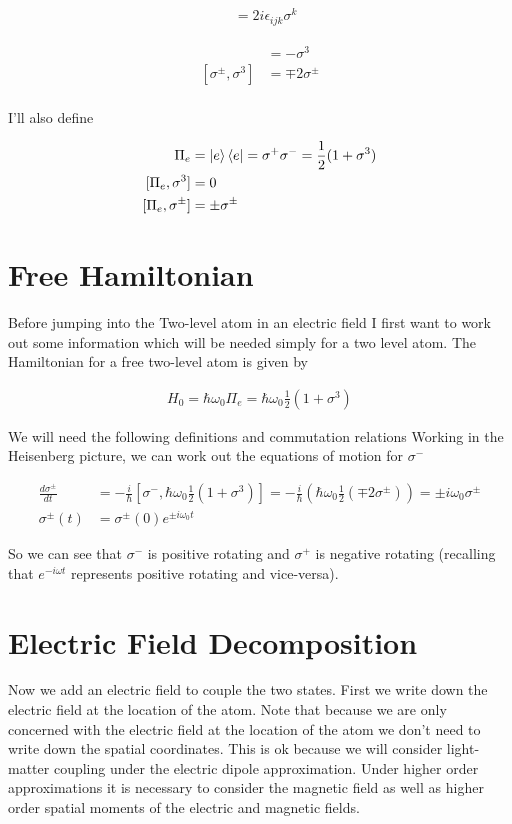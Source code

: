 \documentclass[12pt]{article}
\newcommand{\ddt}[1]{\frac{d #1}{dt}}
\begin{document}
\begin{align}
[\sigma^i, \sigma^j] &= 2i\epsilon_{ijk} \sigma^k
\end{align}

\begin{align}
[\sigma^-, \sigma^+] &= - \sigma^3\\
[\sigma^\pm, \sigma^3] &= \mp2\sigma^\pm\\
\end{align}

I'll also define

\begin{align}
\Pi_e &= \ket{e}\bra{e} = \sigma^+\sigma^- = \frac{1}{2}(1+\sigma^3)\\
[\Pi_e,\sigma^3] &= 0\\
[\Pi_e,\sigma^{\pm}] &= \pm \sigma^{\pm}
\end{align}

\section{Free Hamiltonian}

Before jumping into the Two-level atom in an electric field I first want to work out some information which will be needed simply for a two level atom. The Hamiltonian for a free two-level atom is given by

\begin{align}
H_0 = \hbar \omega_0 \Pi_e = \hbar \omega_0 \frac{1}{2}(1+\sigma^3)
\end{align}

We will need the following definitions and commutation relations
Working in the Heisenberg picture, we can work out the equations of motion for $\sigma^-$

\begin{align}
\ddt{\sigma^{\pm}} &= -\frac{i}{\hbar}\left[\sigma^-,\hbar\omega_0\frac{1}{2}(1+\sigma^3)\right] = -\frac{i}{\hbar}(\hbar\omega_0 \frac{1}{2} (\mp 2 \sigma^{\pm})) = \pm i \omega_0 \sigma^{\pm}\\
\sigma^{\pm}(t) &= \sigma^{\pm}(0) e^{\pm i \omega_0 t}
\end{align}

So we can see that $\sigma^-$ is positive rotating and $\sigma^+$ is negative rotating (recalling that $e^{-i\omega t}$ represents positive rotating and vice-versa).

\section{Electric Field Decomposition}
Now we add an electric field to couple the two states.
First we write down the electric field at the location of the atom. Note that because we are only concerned with the electric field at the location of the atom we don't need to write down the spatial coordinates. This is ok because we will consider light-matter coupling under the electric dipole approximation. Under higher order approximations it is necessary to consider the magnetic field as well as higher order spatial moments of the electric and magnetic fields.
\end{document}

